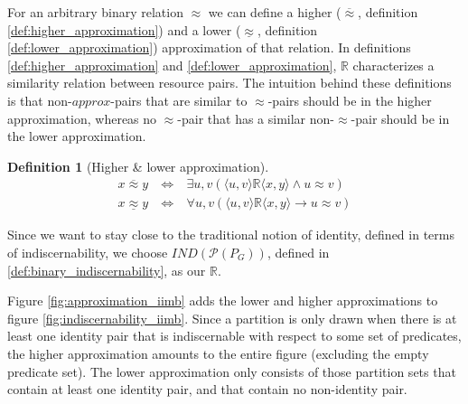 \documentclass[letterpaper]{article}
\newtheorem{definition}{Definition}
\begin{document}
For an arbitrary binary relation $\approx$ we can define a higher ($\overline{\approx}$, definition \ref{def:higher_approximation}) and a lower ($\underline{\approx}$, definition \ref{def:lower_approximation}) approximation of that relation. In definitions \ref{def:higher_approximation} and \ref{def:lower_approximation}, $\mathbb{R}$ characterizes a similarity relation between resource pairs. The intuition behind these definitions is that non-$approx$-pairs that are similar to $\approx$-pairs should be in the higher approximation, whereas no $\approx$-pair that has a similar non-$\approx$-pair should be in the lower approximation.

\begin{definition}[Higher \& lower approximation]
\begin{align}
x \overline{\approx} y \  & \iff & \ 
  \exists u,v (
      \langle u, v \rangle \mathbb{R} \langle x, y \rangle
    \land
      u \approx v
  )
\label{def:higher_approximation}
\\
x \underline{\approx} y \  & \iff & \ 
  \forall u,v (
      \langle u, v \rangle \mathbb{R} \langle x, y \rangle
    \rightarrow
      u \approx v
  )
\label{def:lower_approximation}
\end{align}
\end{definition}

Since we want to stay close to the traditional notion of identity, defined in terms of indiscernability, we choose $IND(\mathcal{P}(P_G))$, defined in \ref{def:binary_indiscernability}, as our $\mathbb{R}$.

Figure \ref{fig:approximation_iimb} adds the lower and higher approximations to figure \ref{fig:indiscernability_iimb}. Since a partition is only drawn when there is at least one identity pair that is indiscernable with respect to some set of predicates, the higher approximation amounts to the entire figure (excluding the empty predicate set). The lower approximation only consists of those partition sets that contain at least one identity pair, and that contain no non-identity pair.
\end{document}
